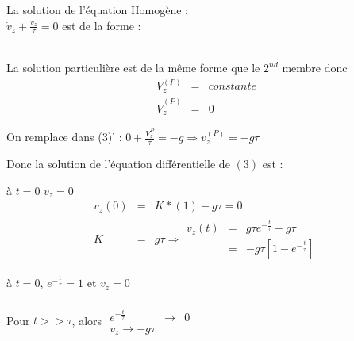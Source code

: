 La solution de l'équation Homogène : ~\\
	$\dot{v}_z + \frac{v_z}{\tau} = 0$ est de la forme : ~\\
	\begin{center}
	\end{center}
	~\\

	La solution particulière est de la même forme que le $2^{nd}$ membre donc \[\begin{array}{rcl}
			V_z^{(P)} &=& constante \\
	\dot{V}_z^{(P)} &=& 0 \end{array}\]

			On remplace dans (3)' : 
			$0 + \frac{V_z^P}{\tau} = -g \Rightarrow v_z^{(P)} = -g\tau$ 

			Donc la solution de l'équation différentielle de $(3)$ est :

			\begin{center}
			\end{center}

			à $t=0$ $v_z=0$
			\[\begin{array}{rcl}
					v_z(0) &=& K * (1) - g\tau = 0 \\
					K &=& g\tau \Rightarrow \begin{array}{rcl} 
						v_z(t) &=&  g \tau e^{-\frac{t}{\tau}} - g \tau \\
						&=& -g\tau[1-e^{-\frac{t}{\tau}}] \end{array}
			\end{array} \]

			à $t=0$, $e^{-\frac{1}{\tau}} = 1$ et $v_z=0$ ~\\
			~\\
			Pour $t >> \tau$, alors $\begin{array}{rcl}
				e^{-\frac{t}{\tau}} &\rightarrow& 0 \\
			v_z \rightarrow -g\tau \end{array}$


